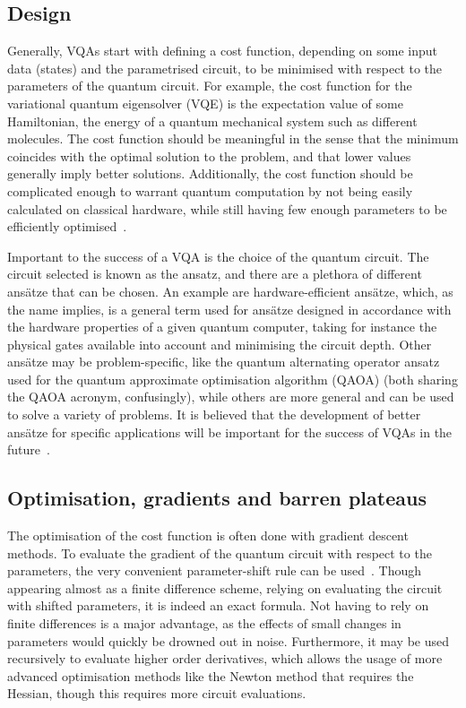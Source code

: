\subsection{Design}
Generally, VQAs start with defining a cost function, depending on some input data (states) and the parametrised circuit, to be minimised with respect to the parameters of the quantum circuit.
For example, the cost function for the variational quantum eigensolver (VQE) is the expectation value of some Hamiltonian, the energy of a quantum mechanical system such as different molecules.
The cost function should be meaningful in the sense that the minimum coincides with the optimal solution to the problem, and that lower values generally imply better solutions.
Additionally, the cost function should be complicated enough to warrant quantum computation by not being easily calculated on classical hardware, while still having few enough parameters to be efficiently optimised~\autocite{cerezo2021}.

Important to the success of a VQA is the choice of the quantum circuit.
The circuit selected is known as the ansatz, and there are a plethora of different ansätze that can be chosen.
An example are hardware-efficient ansätze, which, as the name implies, is a general term used for ansätze designed in accordance with the hardware properties of a given quantum computer, taking for instance the physical gates available into account and minimising the circuit depth.
Other ansätze may be problem-specific, like the quantum alternating operator ansatz used for the quantum approximate optimisation algorithm (QAOA) (both sharing the QAOA acronym, confusingly), while others are more general and can be used to solve a variety of problems.
It is believed that the development of better ansätze for specific applications will be important for the success of VQAs in the future~\autocite{cerezo2021}.

\subsection{Optimisation, gradients and barren plateaus}
The optimisation of the cost function is often done with gradient descent methods.
To evaluate the gradient of the quantum circuit with respect to the parameters, the very convenient parameter-shift rule can be used~\autocite{schuld2019}.
Though appearing almost as a finite difference scheme, relying on evaluating the circuit with shifted parameters, it is indeed an exact formula.
Not having to rely on finite differences is a major advantage, as the effects of small changes in parameters would quickly be drowned out in noise.
Furthermore, it may be used recursively to evaluate higher order derivatives, which allows the usage of more advanced optimisation methods like the Newton method that requires the Hessian, though this requires more circuit evaluations.

